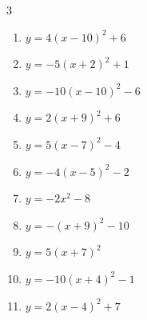 \begin{multicols}{3}
\begin{enumerate}
        \phantom{$\displaystyle 頂点\left( 0 , -9 \right)$}

  \item $\displaystyle y=4\left( x-10\right)^{2}+6$

        \phantom{$\displaystyle 頂点\left( 10 , 6 \right)$}

  \item $\displaystyle y=-5\left( x+2\right)^{2}+1$

        \phantom{$\displaystyle 頂点\left( -2 , 1 \right)$}

  \item $\displaystyle y=-10\left( x-10\right)^{2}-6$

        \phantom{$\displaystyle 頂点\left( 10 , -6 \right)$}

  \item $\displaystyle y=2\left( x+9\right)^{2}+6$

        \phantom{$\displaystyle 頂点\left( -9 , 6 \right)$}

  \item $\displaystyle y=5\left( x-7\right)^{2}-4$

        \phantom{$\displaystyle 頂点\left( 7 , -4 \right)$}

  \item $\displaystyle y=-4\left( x-5\right)^{2}-2$

        \phantom{$\displaystyle 頂点\left( 5 , -2 \right)$}

  \item $\displaystyle y=-2x^{2}-8$

        \phantom{$\displaystyle 頂点\left( 0 , -8 \right)$}

  \item $\displaystyle y=-\left( x+9\right)^{2}-10$

        \phantom{$\displaystyle 頂点\left( -9 , -10 \right)$}

  \item $\displaystyle y=5\left( x+7\right)^{2}$

        \phantom{$\displaystyle 頂点\left( -7 , 0 \right)$}

  \item $\displaystyle y=-10\left( x+4\right)^{2}-1$

        \phantom{$\displaystyle 頂点\left( -4 , -1 \right)$}

\columnbreak %

  \item $\displaystyle y=2\left( x-4\right)^{2}+7$


\end{enumerate}
\end{multicols}
